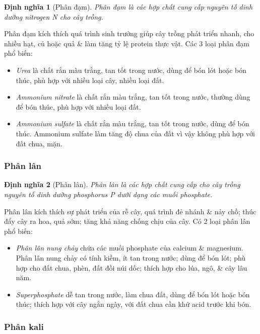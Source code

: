 \documentclass{article}
\newtheorem{dinhnghia}{Định nghĩa}
\begin{document}
\begin{dinhnghia}[Phân đạm]
	{\rm Phân đạm} là các hợp chất cung cấp nguyên tố dinh dưỡng nitrogen {\rm N} cho cây trồng.
\end{dinhnghia}
Phân đạm kích thích quá trình sinh trưởng giúp cây trồng phát triển nhanh, cho nhiều hạt, củ hoặc quả \& làm tăng tỷ lệ protein thực vật. Các 3 loại phân đạm phổ biến:
\begin{itemize}
	\item \textit{Urea}  là chất rắn màu trắng, tan tốt trong nước, dùng để bón lót hoặc bón thúc, phù hợp với nhiều loại cây, nhiều loại đất.
	\item \textit{Ammonium nitrate}  là chất rắn màu trắng, tan tốt trong nước, thường dùng để bón thúc, phù hợp với nhiều loại đất.
	\item \textit{Ammonium sulfate}  là chất rắn màu trắng, tan tốt trong nước, dùng để bón thúc. Ammonium sulfate làm tăng độ chua của đất vì vậy không phù hợp với đất chua, mặn.
\end{itemize}

\subsubsection{Phân lân}

\begin{dinhnghia}[Phân lân]
	{\rm Phân lân} là các hợp chất cung cấp cho cây trồng nguyên tố dinh dưỡng phosphorus {\rm P} dưới dạng các muối phosphate.
\end{dinhnghia}
Phân lân kích thích sự phát triển của rễ cây, quá trình đẻ nhánh \& nảy chồ; thúc đẩy cây ra hoa, quả sớm; tăng khả năng chống chịu của cây. Có 2 loại phân lân phổ biến:
\begin{itemize}
	\item \textit{Phân lân nung chảy} chứa các muối phosphate của calcium \& magnesium. Phân lân nung chảy có tính kiềm, ít tan trong nước; dùng để bón lót; phù hợp cho đất chua, phèn, đất đồi núi dốc; thích hợp cho lúa, ngô, \& cây lâu năm.
	\item \textit{Superphosphate}  dễ tan trong nước, làm chua đất, dùng để bón lót hoặc bón thúc; thích hợp với cây ngắn ngày, với đất chua cần khử acid trước khi bón.
\end{itemize}

\subsubsection{Phân kali}
\end{document}
